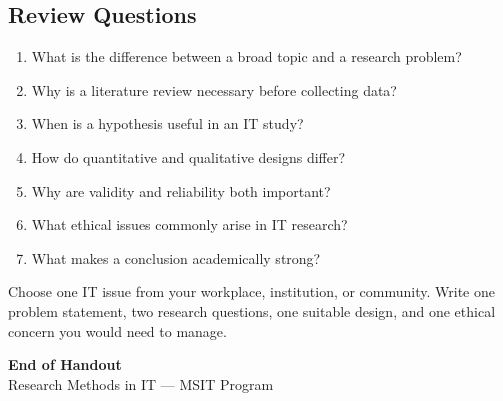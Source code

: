 \documentclass[11pt,a4paper]{article}
\begin{document}
\subsection{Review Questions}

\begin{enumerate}[leftmargin=*]
  \item What is the difference between a broad topic and a research problem?
  \item Why is a literature review necessary before collecting data?
  \item When is a hypothesis useful in an IT study?
  \item How do quantitative and qualitative designs differ?
  \item Why are validity and reliability both important?
  \item What ethical issues commonly arise in IT research?
  \item What makes a conclusion academically strong? 
\end{enumerate}

\begin{examplebox}
Choose one IT issue from your workplace, institution, or community. Write one problem statement, two research questions, one suitable design, and one ethical concern you would need to manage.
\end{examplebox}

\vfill
\begin{center}
{\large\textcolor{primary}{\textbf{End of Handout}}}\\[4pt]
{\small\textcolor{gray!70!black}{Research Methods in IT --- MSIT Program}}
\end{center}
\end{document}

